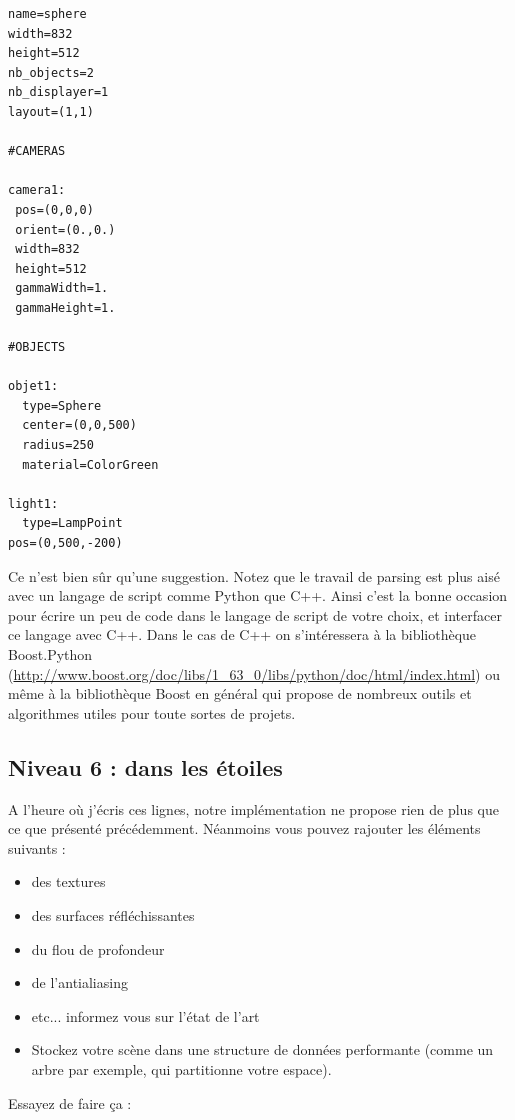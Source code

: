 \documentclass[a4paper, 11pt]{article}
\begin{document}
\fontsize{9}{11}\selectfont
\begin{verbatim}
name=sphere
width=832
height=512
nb_objects=2
nb_displayer=1
layout=(1,1)

#CAMERAS

camera1:
 pos=(0,0,0)
 orient=(0.,0.)
 width=832
 height=512
 gammaWidth=1.
 gammaHeight=1.

#OBJECTS

objet1:
  type=Sphere
  center=(0,0,500)
  radius=250
  material=ColorGreen

light1:
  type=LampPoint
pos=(0,500,-200)

\end{verbatim}  
  
Ce n'est bien sûr qu'une suggestion. Notez que le travail de parsing est plus aisé avec un langage de script comme Python que C++. Ainsi c'est la bonne occasion pour écrire un peu de code dans le langage de script de votre choix, et interfacer ce langage avec C++. Dans le cas de C++ on s'intéressera à la bibliothèque Boost.Python (\url{http://www.boost.org/doc/libs/1_63_0/libs/python/doc/html/index.html}) ou même à la bibliothèque Boost en général qui propose de nombreux outils et algorithmes utiles pour toute sortes de projets.  
  

\subsection*{Niveau 6 : dans les étoiles}  
  
A l'heure où j'écris ces lignes, notre implémentation ne propose rien de plus que ce que présenté précédemment. Néanmoins vous pouvez rajouter les éléments suivants :  
  
\begin{itemize}
\item des textures
\item des surfaces réfléchissantes
\item du flou de profondeur
\item de l'antialiasing
\item etc... informez vous sur l'état de l'art
\item Stockez votre scène dans une structure de données performante (comme un arbre par exemple, qui partitionne votre espace).
\end{itemize}  
  
Essayez de faire ça :  
  
\end{document}
